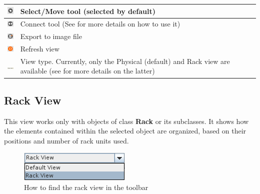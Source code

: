 \documentclass[a4paper]{article}
\begin{document}
\begin{table}[h!]
\begin{tabular}[h!]{lp{10cm}}
				\midrule
				\includegraphics[width=0.5cm]{img/icon_select_tool.png} & Select/Move tool (selected by default)\\
				\midrule
				\includegraphics[width=0.5cm]{img/icon_connect_tool.png} & Connect tool (See \textbf{\nameref{sec:physical_connections}} for more details on how to use it)\\
				\midrule
				\includegraphics[width=0.5cm]{img/icon_export.png} & Export to image file\\
				\midrule
				\includegraphics[width=0.5cm]{img/icon_refresh_view.png} & Refresh view\\
				\midrule
				\includegraphics[width=0.5cm]{img/icon_view_type.png} & View type. Currently, only the Physical (default) and Rack view are available (see \textbf{\nameref{sec:rack_view}} for more details on the latter)\\
			\end{tabular}
		\end{table}
		
		\subsection{Rack View} \label{sec:rack_view}
		This view works only with objects of class \textbf{Rack} or its subclasses. It shows how the elements contained within the selected object are organized, based on their positions and number of rack units used. 
		\begin{figure}[h!]
			\centering
			\includegraphics[width=0.2\linewidth]{img/rack_view_combobox.png}
			\caption{How to find the rack view in the toolbar}
			\label{fig:rack_view_combobox}
		\end{figure}
		
\end{document}
